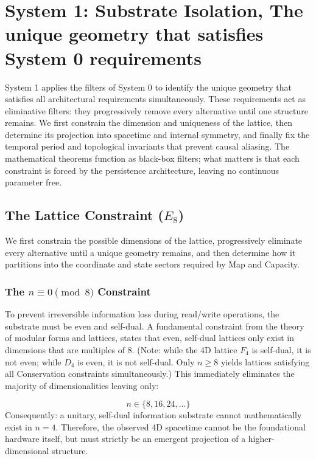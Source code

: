 \section{System 1: Substrate Isolation, The unique geometry that satisfies System 0 requirements}
\label{sec:system1_projection}
System 1 applies the filters of System 0 to identify the unique geometry that satisfies all architectural requirements simultaneously. These requirements act as eliminative filters: they progressively remove every alternative until one structure remains. We first constrain the dimension and uniqueness of the lattice, then determine its projection into spacetime and internal symmetry, and finally fix the temporal period and topological invariants that prevent causal aliasing. The mathematical theorems function as black-box filters; what matters is that each constraint is forced by the persistence architecture, leaving no continuous parameter free.

\subsection{The Lattice Constraint (\texorpdfstring{$E_8$}{E8})}
\label{sec:lattice_selection}
We first constrain the possible dimensions of the lattice, progressively eliminate every alternative until a unique geometry remains, and then determine how it partitions into the coordinate and state sectors required by Map and Capacity.

\subsubsection{The \texorpdfstring{$n \equiv 0 \pmod 8$}{neq0mod8} Constraint}
\label{sec:kneserstheorem}
To prevent irreversible information loss during read/write operations, the substrate must be even and self-dual. A fundamental constraint from the theory of modular forms and lattices\cite{conway_sphere_1988}, states that even, self-dual lattices only exist in dimensions that are multiples of 8. (Note: while the 4D lattice $F_4$ is self-dual, it is not even; while $D_4$ is even, it is not self-dual. Only $n \ge 8$ yields lattices satisfying all Conservation constraints simultaneously.) This immediately eliminates the majority of dimensionalities leaving only: 

\[ n \in \{8, 16, 24, \dots\} \]
Consequently: a unitary, self-dual information substrate cannot mathematically exist in $n=4$. Therefore, the observed 4D spacetime cannot be the foundational hardware itself, but must strictly be an emergent projection of a higher-dimensional structure.

